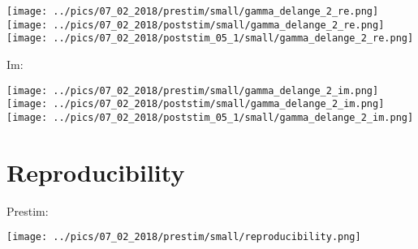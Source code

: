 \documentclass{article}
\begin{document}
\hspace{0.5cm}
\texttt{[image: ../pics/07\_02\_2018/prestim/small/gamma\_delange\_2\_re.png]}
\hspace{0.5cm}
\texttt{[image: ../pics/07\_02\_2018/poststim/small/gamma\_delange\_2\_re.png]}
\hspace{0.5cm}
\texttt{[image: ../pics/07\_02\_2018/poststim\_05\_1/small/gamma\_delange\_2\_re.png]}

Im:

\hspace{0.5cm}
\texttt{[image: ../pics/07\_02\_2018/prestim/small/gamma\_delange\_2\_im.png]}
\hspace{0.5cm}
\texttt{[image: ../pics/07\_02\_2018/poststim/small/gamma\_delange\_2\_im.png]}
\hspace{0.5cm}
\texttt{[image: ../pics/07\_02\_2018/poststim\_05\_1/small/gamma\_delange\_2\_im.png]}





\newpage

\section{Reproducibility}
\centering
Prestim:

\texttt{[image: ../pics/07\_02\_2018/prestim/small/reproducibility.png]}
\end{document}
